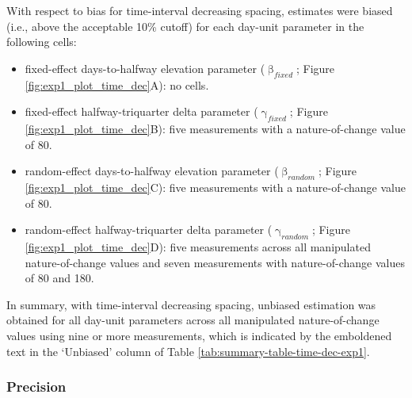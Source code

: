 \documentclass[
12pt, %
twoside,
english]{guelphthesis}
\begin{document}
With respect to bias for time-interval decreasing spacing, estimates were biased (i.e., above the acceptable 10\% cutoff) for each day-unit parameter in the following cells:
\begin{itemize}
\tightlist
\item
  fixed-effect days-to-halfway elevation parameter (\(\upbeta_{fixed}\); Figure \ref{fig:exp1_plot_time_dec}A): no cells.
\item
  fixed-effect halfway-triquarter delta parameter (\(\upgamma_{fixed}\); Figure \ref{fig:exp1_plot_time_dec}B): five measurements with a nature-of-change value of 80.
\item
  random-effect days-to-halfway elevation parameter (\(\upbeta_{random}\); Figure \ref{fig:exp1_plot_time_dec}C): five measurements with a nature-of-change value of 80.
\item
  random-effect halfway-triquarter delta parameter (\(\upgamma_{random}\); Figure \ref{fig:exp1_plot_time_dec}D): five measurements across all manipulated nature-of-change values and seven measurements with nature-of-change values of 80 and 180.
\end{itemize}
In summary, with time-interval decreasing spacing, unbiased estimation was obtained for all day-unit parameters across all manipulated nature-of-change values using nine or more measurements, which is indicated by the emboldened text in the `Unbiased' column of Table \ref{tab:summary-table-time-dec-exp1}.

\hypertarget{precision-time-dec-exp1}{%
\subsubsection{Precision}\label{precision-time-dec-exp1}}
\end{document}

